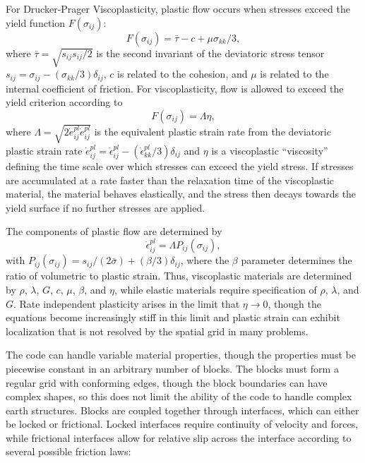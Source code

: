 \documentclass[12pt]{article}   	%
\begin{document}
For Drucker-Prager Viscoplasticity, plastic flow occurs when stresses exceed the yield function $F(\sigma_{ij})$:
\begin{equation}
F(\sigma_{ij}) = \bar{\tau}-c+\mu\sigma_{kk}/3,
\end{equation}
where $\bar{\tau}=\sqrt{s_{ij}s_{ij}/2}$ is the second invariant of the deviatoric stress tensor $s_{ij}=\sigma_{ij}-(\sigma_{kk}/3)\delta_{ij}$, $c$ is related to the cohesion, and $\mu$ is related to the internal coefficient of friction. For viscoplasticity, flow is allowed to exceed the yield criterion according to
\begin{equation}
F(\sigma_{ij})=\Lambda\eta,
\end{equation}
where $\Lambda=\sqrt{2\dot{e}^{pl}_{ij}\dot{e}^{pl}_{ij}}$ is the equivalent plastic strain rate from the deviatoric plastic strain rate $\dot{e}^{pl}_{ij}=\dot{\epsilon}^{pl}_{ij}-(\dot{\epsilon}^{pl}_{kk}/3)\delta_{ij}$ and $\eta$ is a viscoplastic ``viscosity'' defining the time scale over which stresses can exceed the yield stress. If stresses are accumulated at a rate faster than the relaxation time of the viscoplastic material, the material behaves elastically, and the stress then decays towards the yield surface if no further stresses are applied.

The components of plastic flow are determined by
\begin{equation}
\dot{\epsilon}^{pl}_{ij}=\Lambda P_{ij}\left(\sigma_{ij}\right),
\end{equation}
with $P_{ij}(\sigma_{ij})=s_{ij}/(2\bar{\sigma})+(\beta/3)\delta_{ij}$, where the $\beta$ parameter determines the ratio of volumetric to plastic strain. Thus, viscoplastic materials are determined by $\rho$, $\lambda$, $G$, $c$, $\mu$, $\beta$, and $\eta$, while elastic materials require specification of $\rho$, $\lambda$, and $G$. Rate independent plasticity arises in the limit that $\eta \rightarrow 0$, though the equations become increasingly stiff in this limit and plastic strain can exhibit localization that is not resolved by the spatial grid in many problems.

The code can handle variable material properties, though the properties must be piecewise constant in an arbitrary number of blocks. The blocks must form a regular grid with conforming edges, though the block boundaries can have complex shapes, so this does not limit the ability of the code to handle complex earth structures. Blocks are coupled together through interfaces, which can either be locked or frictional. Locked interfaces require continuity of velocity and forces, while frictional interfaces allow for relative slip across the interface according to several possible friction laws:
\end{document}
